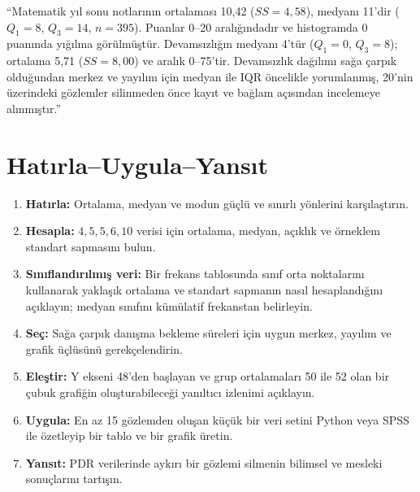 ``Matematik yıl sonu notlarının ortalaması 10,42 ($SS=4{,}58$), medyanı
11'dir ($Q_1=8$, $Q_3=14$, $n=395$). Puanlar 0--20 aralığındadır ve
histogramda 0 puanında yığılma görülmüştür. Devamsızlığın medyanı 4'tür
($Q_1=0$, $Q_3=8$); ortalama 5,71 ($SS=8{,}00$) ve aralık 0--75'tir.
Devamsızlık dağılımı sağa çarpık olduğundan merkez ve yayılım için medyan ile
IQR öncelikle yorumlanmış, 20'nin üzerindeki gözlemler silinmeden önce kayıt
ve bağlam açısından incelemeye alınmıştır.''




\section*{Hatırla--Uygula--Yansıt}

\begin{enumerate}
\renewcommand{\labelenumi}{\textbf{\Alph{enumi}.}}
  \item \textbf{Hatırla:} Ortalama, medyan ve modun güçlü ve sınırlı yönlerini karşılaştırın.
  \item \textbf{Hesapla:} $4,5,5,6,10$ verisi için ortalama, medyan, açıklık ve örneklem standart sapmasını bulun.
  \item \textbf{Sınıflandırılmış veri:} Bir frekans tablosunda sınıf orta noktalarını kullanarak yaklaşık ortalama ve standart sapmanın nasıl hesaplandığını açıklayın; medyan sınıfını kümülatif frekanstan belirleyin.
  \item \textbf{Seç:} Sağa çarpık danışma bekleme süreleri için uygun merkez, yayılım ve grafik üçlüsünü gerekçelendirin.
  \item \textbf{Eleştir:} Y ekseni 48'den başlayan ve grup ortalamaları 50 ile 52 olan bir çubuk grafiğin oluşturabileceği yanıltıcı izlenimi açıklayın.
  \item \textbf{Uygula:} En az 15 gözlemden oluşan küçük bir veri setini Python veya SPSS ile özetleyip bir tablo ve bir grafik üretin.
  \item \textbf{Yansıt:} PDR verilerinde aykırı bir gözlemi silmenin bilimsel ve mesleki sonuçlarını tartışın.
\end{enumerate}
